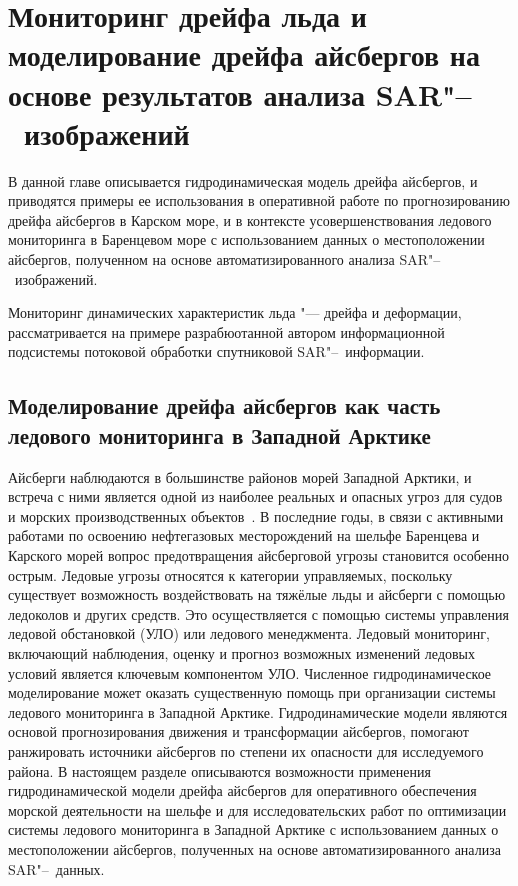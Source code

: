 \chapter{Мониторинг дрейфа льда и моделирование дрейфа айсбергов на основе результатов анализа SAR"--~изображений} \label{chapt4}

В данной главе описывается гидродинамическая модель дрейфа айсбергов, и приводятся примеры ее использования в оперативной работе по прогнозированию дрейфа айсбергов в Карском море, и в контексте усовершенствования ледового мониторинга в Баренцевом море с использованием данных о местоположении айсбергов, полученном на основе автоматизированного анализа SAR"--~изображений.

Мониторинг динамических характеристик льда "--- дрейфа и деформации, рассматривается на примере разрабюотанной автором информационной подсистемы потоковой обработки спутниковой SAR"--~информации.

\section{Моделирование дрейфа айсбергов как часть ледового мониторинга в Западной Арктике} \label{sect4_1}

Айсберги наблюдаются в большинстве районов морей Западной Арктики, и встреча с ними является одной из наиболее реальных и опасных угроз для судов и морских производственных объектов~\cite{Mironov_Smirnov_Iceberg_2015}. В последние годы, в связи с активными работами по освоению нефтегазовых месторождений на шельфе Баренцева и Карского морей вопрос предотвращения айсберговой угрозы становится особенно острым. Ледовые угрозы относятся к категории управляемых, поскольку существует возможность воздействовать на тяжёлые льды и айсберги с помощью ледоколов и других средств. Это осуществляется с помощью системы управления ледовой обстановкой (УЛО) или ледового менеджмента. Ледовый мониторинг, включающий наблюдения, оценку и прогноз возможных изменений ледовых условий является ключевым компонентом УЛО.
Численное гидродинамическое моделирование может оказать существенную помощь при организации системы ледового мониторинга в Западной Арктике. Гидродинамические модели являются основой прогнозирования движения и трансформации айсбергов, помогают ранжировать источники айсбергов по степени их опасности для исследуемого района. В настоящем разделе описываются возможности применения гидродинамической модели дрейфа айсбергов для оперативного обеспечения морской деятельности на шельфе и для исследовательских работ по оптимизации системы ледового мониторинга в Западной Арктике с использованием данных о местоположении айсбергов, полученных на основе автоматизированного анализа SAR"--~данных.

